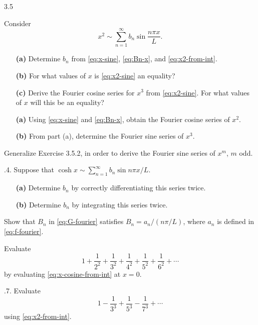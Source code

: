 \begin{exercises}{3.5}
\item Consider
\begin{equation}
\label{eq:x2-sine}
x^2 \sim \sum_{n=1}^{\infty} b_n \sin \frac{n\pi x}{L}.
\end{equation}
\begin{enumerate}
\item[\textbf{(a)}] Determine $b_n$ from \eqref{eq:x-sine}, \eqref{eq:Bn-x}, and \eqref{eq:x2-from-int}.
\item[\textbf{(b)}] For what values of $x$ is \eqref{eq:x2-sine} an equality?
\item[\starred\textbf{(c)}] Derive the Fourier cosine series for $x^3$ from \eqref{eq:x2-sine}.  For what values of $x$ will this be an equality?
\end{enumerate}

\item
\begin{enumerate}
\item[\textbf{(a)}] Using \eqref{eq:x-sine} and \eqref{eq:Bn-x}, obtain the Fourier cosine series of $x^2$.
\item[\textbf{(b)}] From part (a), determine the Fourier sine series of $x^3$.
\end{enumerate}

\item Generalize Exercise 3.5.2, in order to derive the Fourier sine series of $x^m$, $m$ odd.

\item[\starred 3.5.4.] Suppose that $\cosh x \sim \sum_{n=1}^{\infty} b_n \sin n\pi x/L$.
\begin{enumerate}
\item[\textbf{(a)}] Determine $b_n$ by correctly differentiating this series twice.
\item[\textbf{(b)}] Determine $b_n$ by integrating this series twice.
\end{enumerate}

\item Show that $B_n$ in \eqref{eq:G-fourier} satisfies $B_n = a_n/(n\pi/L)$, where $a_n$ is defined in \eqref{eq:f-fourier}.

\item Evaluate
\[
1 + \frac{1}{2^2} + \frac{1}{3^2} + \frac{1}{4^2} + \frac{1}{5^2} + \frac{1}{6^2} + \cdots
\]
by evaluating \eqref{eq:x-cosine-from-int} at $x = 0$.

\item[\starred 3.5.7.] Evaluate
\[
1 - \frac{1}{3^3} + \frac{1}{5^3} - \frac{1}{7^3} + \cdots
\]
using \eqref{eq:x2-from-int}.
\end{exercises}
